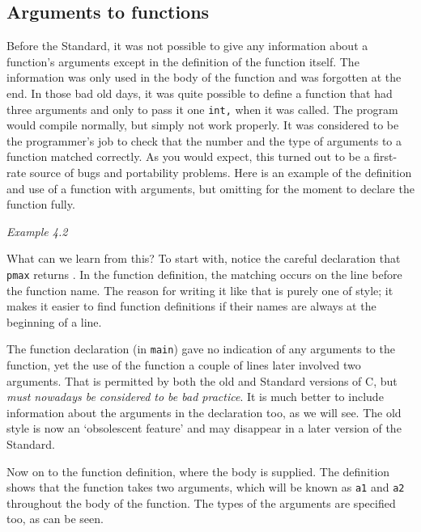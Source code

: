   

  \subsection{Arguments to functions}
   

   Before the Standard, it was not possible to give any information about
    a function's arguments except in the definition of the function itself.
    The information was only used in the body of the function and was
    forgotten at the end. In those bad old days, it was quite possible to
    define a function that had three \double{} arguments and only
    to pass it one \texttt{int,} when it was called. The program would
    compile normally, but simply not work properly. It was considered to be
    the programmer's job to check that the number and the type of arguments
    to a function matched correctly. As you would expect, this turned out to
    be a first-rate source of bugs and portability problems. Here is an
    example of the definition and use of a function with arguments, but
    omitting for the moment to declare the function fully.


    \begin{center}\textit{Example 4.2}\end{center}

   What can we learn from this? To start with, notice the careful
    declaration that \texttt{pmax} returns \void. In the
    function definition, the matching \void{} occurs on the line
    before the function name. The reason for writing it like that is purely
    one of style; it makes it easier to find function definitions if their
    names are always at the beginning of a line.


   The function declaration (in \texttt{main}) gave no indication of
    any arguments to the function, yet the use of the function a couple of
    lines later involved two arguments. That is permitted by both the old
    and Standard versions of C, but \textit{must nowadays be considered to be
     bad practice}. It is much better to include information about the
    arguments in the declaration too, as we will see. The old style is now
    an `obsolescent feature' and may disappear in a later version of
    the Standard.


   Now on to the function definition, where the body is supplied. The
    definition shows that the function takes two arguments, which will be
    known as \texttt{a1} and \texttt{a2} throughout the body of the
    function. The types of the arguments are specified too, as can be
    seen.


